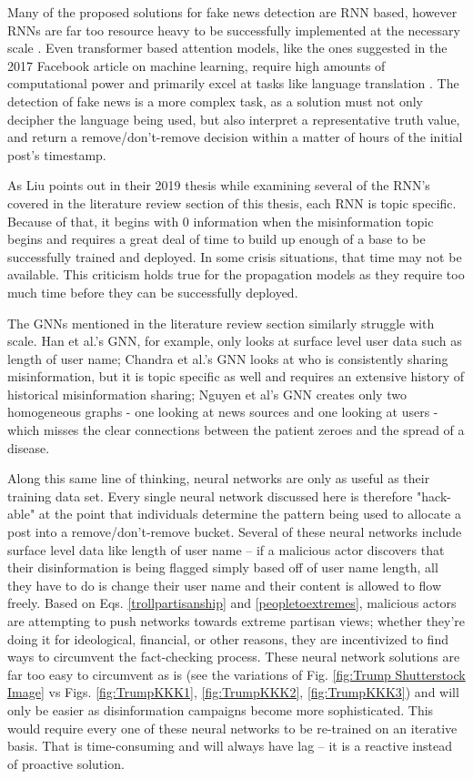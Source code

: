 \documentclass[preprint,review,12pt]{elsarticle}
\begin{document}
Many of the proposed solutions for fake news detection are RNN based, however RNNs are far too resource heavy to be successfully implemented at the necessary scale \cite{gehring2017novel, sze2017efficient}. Even transformer based attention models, like the ones suggested in the 2017 Facebook article on machine learning, require high amounts of computational power and primarily excel at tasks like language translation \cite{vaswani2017attention}. The detection of fake news is a more complex task, as a solution must not only decipher the language being used, but also interpret a representative truth value, and return a remove/don't-remove decision within a matter of hours of the initial post's timestamp.

As Liu points out in their 2019 thesis \cite{liu2019early} while examining several of the RNN's covered in the literature review section of this thesis, each RNN is topic specific. Because of that, it begins with 0 information when the misinformation topic begins and requires a great deal of time to build up enough of a base to be successfully trained and deployed. In some crisis situations, that time may not be available. This criticism holds true for the propagation models as they require too much time before they can be successfully deployed.

The GNNs mentioned in the literature review section similarly struggle with scale. Han et al.'s GNN, for example, only looks at surface level user data such as length of user name; Chandra et al.'s GNN looks at who is consistently sharing misinformation, but it is topic specific as well and requires an extensive history of historical misinformation sharing; Nguyen et al's GNN creates only two homogeneous graphs - one looking at news sources and one looking at users - which misses the clear connections between the patient zeroes and the spread of a disease.

Along this same line of thinking, neural networks are only as useful as their training data set. Every single neural network discussed here is therefore "hack-able" at the point that individuals determine the pattern being used to allocate a post into a remove/don't-remove bucket. Several of these neural networks include surface level data like length of user name -- if a malicious actor discovers that their disinformation is being flagged simply based off of user name length, all they have to do is change their user name and their content is allowed to flow freely. Based on Eqs. \ref{trollpartisanship} and \ref{peopletoextremes}, malicious actors are attempting to push networks towards extreme partisan views; whether they're doing it for ideological, financial, or other reasons, they are incentivized to find ways to circumvent the fact-checking process. These neural network solutions are far too easy to circumvent as is (see the variations of Fig. \ref{fig:Trump Shutterstock Image} vs Figs. \ref{fig:TrumpKKK1}, \ref{fig:TrumpKKK2}, \ref{fig:TrumpKKK3}) and will only be easier as disinformation campaigns become more sophisticated. This would require every one of these neural networks to be re-trained on an iterative basis. That is time-consuming and will always have lag -- it is a reactive instead of proactive solution.
\end{document}
